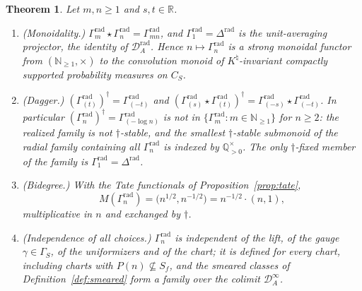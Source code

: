 \documentclass[11pt]{amsart}
\newtheorem{theorem}{Theorem}[section]
\theoremstyle{definition}
\theoremstyle{remark}
\newcommand{\R}{\mathbb R}
\newcommand{\N}{\mathbb N}
\newcommand{\Q}{\mathbb Q}
\newcommand{\Knat}{K^{\natural}}
\newcommand{\Drad}{\mathcal D_A^{\mathrm{rad}}}
\newcommand{\DA}{\mathcal D_A}
\begin{document}
\begin{theorem}\label{thm:radmonoidal}
Let $m,n\ge1$ and $s,t\in\R$.
\begin{enumerate}
\item[(i)] \emph{(Monoidality.)}
$\Gamma_m^{\mathrm{rad}}\star\Gamma_n^{\mathrm{rad}}=\Gamma_{mn}^{\mathrm{rad}}$,
and $\Gamma_1^{\mathrm{rad}}=\Delta^{\mathrm{rad}}$ is the unit-averaging
projector, the identity of $\Drad$. Hence $n\mapsto\Gamma_n^{\mathrm{rad}}$ is
a strong monoidal functor from $(\N_{\ge1},\times)$ to the convolution monoid
of $\Knat$-invariant compactly supported probability measures on $C_S$.
\item[(ii)] \emph{(Dagger.)}
$(\Gamma^{\mathrm{rad}}_{(t)})^\dagger=\Gamma^{\mathrm{rad}}_{(-t)}$ and
$(\Gamma^{\mathrm{rad}}_{(s)}\star\Gamma^{\mathrm{rad}}_{(t)})^\dagger
=\Gamma^{\mathrm{rad}}_{(-s)}\star\Gamma^{\mathrm{rad}}_{(-t)}$. In particular
$(\Gamma_n^{\mathrm{rad}})^\dagger=\Gamma^{\mathrm{rad}}_{(-\log n)}$ is
\emph{not} in $\{\Gamma_m^{\mathrm{rad}}:m\in\N_{\ge1}\}$ for $n\ge2$: the
realized family is not $\dagger$-stable, and the smallest $\dagger$-stable
submonoid of the radial family containing all $\Gamma_n^{\mathrm{rad}}$ is
indexed by $\Q_{>0}^\times$. The only $\dagger$-fixed member of the family is
$\Gamma_1^{\mathrm{rad}}=\Delta^{\mathrm{rad}}$.
\item[(iii)] \emph{(Bidegree.)} With the Tate functionals of
Proposition~\ref{prop:tate},
\begin{equation}\label{eq:radbidegree}
  M(\Gamma_n^{\mathrm{rad}})=\bigl(n^{1/2},n^{-1/2}\bigr)
   =n^{-1/2}\cdot(n,1),
\end{equation}
multiplicative in $n$ and exchanged by $\dagger$.
\item[(iv)] \emph{(Independence of all choices.)} $\Gamma_n^{\mathrm{rad}}$ is
independent of the lift, of the gauge $\gamma\in\Gamma_S$, of the uniformizers
and of the chart; it is defined for every chart, including charts with
$P(n)\not\subseteq S_f$, and the smeared classes of
Definition~\ref{def:smeared} form a family over the colimit $\DA^\infty$.
\end{enumerate}
\end{theorem}
\end{document}
